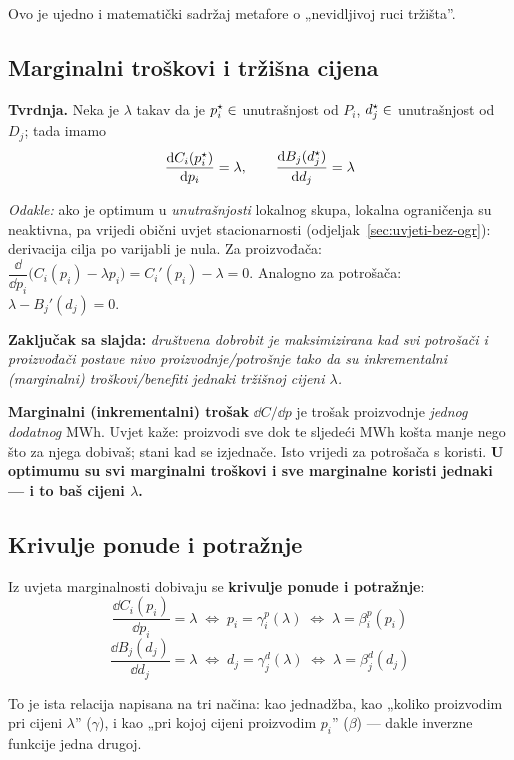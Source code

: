 Ovo je ujedno i matematički sadržaj metafore o „nevidljivoj ruci tržišta”.

\subsection{Marginalni troškovi i tržišna cijena}

\textbf{Tvrdnja.} Neka je $\lambda$ takav da je $p_i^{\star} \in$ unutrašnjost od
$P_i$, $d_j^{\star} \in$ unutrašnjost od $D_j$; tada imamo
\[
\frac{\mathrm{d} C_i(p_i^{\star})}{\mathrm{d} p_i} = \lambda, \qquad
\frac{\mathrm{d} B_j(d_j^{\star})}{\mathrm{d} d_j} = \lambda
\]

\emph{Odakle:} ako je optimum u \emph{unutrašnjosti} lokalnog skupa, lokalna
ograničenja su neaktivna, pa vrijedi obični uvjet stacionarnosti
(odjeljak~\ref{sec:uvjeti-bez-ogr}): derivacija cilja po varijabli je nula.
Za proizvođača: $\dfrac{\dd}{\dd p_i}\big(C_i(p_i) - \lambda p_i\big)
= C_i'(p_i) - \lambda = 0$. \checkmark Analogno za potrošača:
$\lambda - B_j'(d_j) = 0$.

\textbf{Zaključak sa slajda:} \emph{društvena dobrobit je maksimizirana kad svi
potrošači i proizvođači postave nivo proizvodnje/potrošnje tako da su
inkrementalni (marginalni) troškovi/benefiti jednaki tržišnoj cijeni $\lambda$.}

\begin{napomena}
\textbf{Marginalni (inkrementalni) trošak} $\dd C/\dd p$ je trošak proizvodnje
\emph{jednog dodatnog} MWh. Uvjet kaže: proizvodi sve dok te sljedeći MWh košta
manje nego što za njega dobivaš; stani kad se izjednače. Isto vrijedi za
potrošača s koristi. \textbf{U optimumu su svi marginalni troškovi i sve
marginalne koristi jednaki --- i to baš cijeni $\lambda$.}
\end{napomena}

\subsection{Krivulje ponude i potražnje}

Iz uvjeta marginalnosti dobivaju se \textbf{krivulje ponude i potražnje}:
\[
\frac{\dd C_i(p_i)}{\dd p_i} = \lambda
\;\Leftrightarrow\; p_i = \gamma_i^p(\lambda)
\;\Leftrightarrow\; \lambda = \beta_i^p(p_i)
\]
\[
\frac{\dd B_j(d_j)}{\dd d_j} = \lambda
\;\Leftrightarrow\; d_j = \gamma_j^d(\lambda)
\;\Leftrightarrow\; \lambda = \beta_j^d(d_j)
\]

To je ista relacija napisana na tri načina: kao jednadžba, kao „koliko
proizvodim pri cijeni $\lambda$” ($\gamma$), i kao „pri kojoj cijeni proizvodim
$p_i$” ($\beta$) --- dakle inverzne funkcije jedna drugoj.

